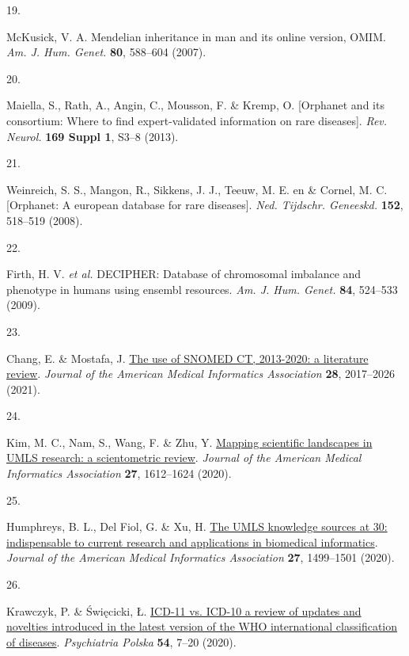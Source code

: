 \documentclass[
]{article}
\newlength{\cslhangindent}
\newlength{\csllabelwidth}
\newenvironment{CSLReferences}[2] %
 {\begin{list}{}{%
  \setlength{\itemindent}{0pt}
  \setlength{\leftmargin}{0pt}
  \setlength{\parsep}{0pt}
  \ifodd #1
   \setlength{\leftmargin}{\cslhangindent}
   \setlength{\itemindent}{-1\cslhangindent}
  \fi
  \setlength{\itemsep}{#2\baselineskip}}}
 {\end{list}}
\newcommand{\CSLLeftMargin}[1]{\parbox[t]{\csllabelwidth}{\strut#1\strut}}
\newcommand{\CSLRightInline}[1]{\parbox[t]{\linewidth - \csllabelwidth}{\strut#1\strut}}
\begin{document}
\begin{CSLReferences}{0}{0}
\CSLLeftMargin{19. }%
\CSLRightInline{McKusick, V. A. Mendelian inheritance in man and its
online version, {OMIM}. \emph{Am. J. Hum. Genet.} \textbf{80}, 588--604
(2007).}

\CSLLeftMargin{20. }%
\CSLRightInline{Maiella, S., Rath, A., Angin, C., Mousson, F. \& Kremp,
O. {[}Orphanet and its consortium: Where to find expert-validated
information on rare diseases{]}. \emph{Rev. Neurol.} \textbf{169 Suppl
1}, S3--8 (2013).}

\CSLLeftMargin{21. }%
\CSLRightInline{Weinreich, S. S., Mangon, R., Sikkens, J. J., Teeuw, M.
E. en \& Cornel, M. C. {[}Orphanet: A european database for rare
diseases{]}. \emph{Ned. Tijdschr. Geneeskd.} \textbf{152}, 518--519
(2008).}

\CSLLeftMargin{22. }%
\CSLRightInline{Firth, H. V. \emph{et al.} {DECIPHER}: Database of
chromosomal imbalance and phenotype in humans using ensembl resources.
\emph{Am. J. Hum. Genet.} \textbf{84}, 524--533 (2009).}

\CSLLeftMargin{23. }%
\CSLRightInline{Chang, E. \& Mostafa, J.
\href{https://doi.org/10.1093/jamia/ocab084}{The use of SNOMED CT,
2013-2020: a literature review}. \emph{Journal of the American Medical
Informatics Association} \textbf{28}, 2017--2026 (2021).}

\CSLLeftMargin{24. }%
\CSLRightInline{Kim, M. C., Nam, S., Wang, F. \& Zhu, Y.
\href{https://doi.org/10.1093/jamia/ocaa107}{Mapping scientific
landscapes in UMLS research: a scientometric review}. \emph{Journal of
the American Medical Informatics Association} \textbf{27}, 1612--1624
(2020).}

\CSLLeftMargin{25. }%
\CSLRightInline{Humphreys, B. L., Del Fiol, G. \& Xu, H.
\href{https://doi.org/10.1093/jamia/ocaa208}{The UMLS knowledge sources
at 30: indispensable to current research and applications in biomedical
informatics}. \emph{Journal of the American Medical Informatics
Association} \textbf{27}, 1499--1501 (2020).}

\CSLLeftMargin{26. }%
\CSLRightInline{Krawczyk, P. \& Święcicki, Ł.
\href{https://doi.org/10.12740/pp/103876}{ICD-11 vs. ICD-10
{\textendash} a review of updates and novelties introduced in the latest
version of the WHO international classification of diseases}.
\emph{Psychiatria Polska} \textbf{54}, 7--20 (2020).}


\end{CSLReferences}
\end{document}
